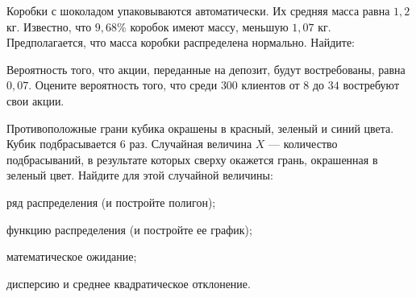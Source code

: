 \vfil

\begin{zkrPlain}{25}\noindent 
	Коробки с шоколадом упаковываются автоматически. Их средняя масса равна $1{,}2$ кг. Известно, что $9{,}68\%$ коробок имеют массу, меньшую $1{,}07$ кг. Предполагается, что масса коробки распределена нормально. Найдите: \par {}
 
\end{zkrPlain}

\vfil

\begin{zkrPlain}{25}\noindent 
	Вероятность того, что акции, переданные на депозит, будут востребованы, равна $ 0{,}07 $. Оцените вероятность того, что среди $ 300 $ клиентов от $ 8 $ до $ 34 $ востребуют свои акции.
 
\end{zkrPlain}

\newpage\setcounter{zad}{0}\setcounter{footnote}{0}



\begin{zkrPlain}{25}\noindent 
		Противоположные грани кубика окрашены в красный, зеленый и синий цвета. Кубик подбрасывается 6 раз. Случайная величина $X$ --- количество подбрасываний, в результате которых сверху окажется грань, окрашенная в зеленый цвет.  Найдите для этой случайной величины: \par \smallskip\small{ \par \zz ряд распределения (и постройте полигон); \par \zz функцию распределения (и постройте ее график); \par \zz математическое ожидание; \par \zz дисперсию и среднее квадратическое отклонение.\par \par}
 
\end{zkrPlain}

\vfil

